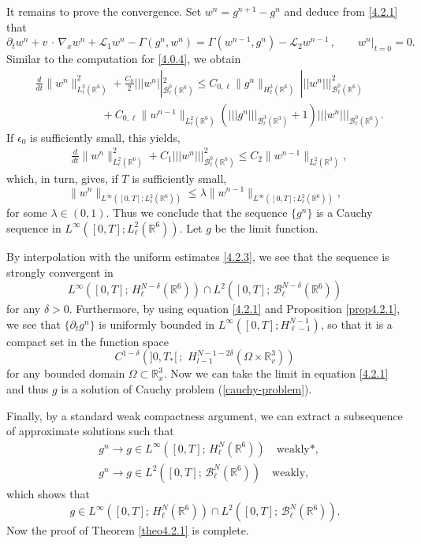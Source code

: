 \documentclass{amsart}[12pt, article]
\begin{document}
It remains to prove the convergence. Set $w^n=g^{n+1}-g^n$ and
deduce {}from \eqref{4.2.1} that
\begin{equation*}
\partial_t w^{n} + v\,\cdot\,\nabla_x w^{n} + {{\mathcal L}}_1 w^{n}
- \Gamma (g^n , w^{n})=\Gamma(w^{n-1}, g^n)-{{\mathcal L}}_2 w^{n-1}\,,\qquad w^{n}|_{t=0}=0.
\end{equation*}
Similar to the computation for \eqref{4.0.4}, we obtain
\begin{align*}\label{4.0.4-u}
&\frac{d}{d t}\|w^n\|^2_{L^2_\ell({{{\mathbb R}}}^6)}+\frac{C_0}{2}
|||w^n||^2_{{{\mathcal B}}^{0}_\ell({{{\mathbb R}}}^6)}\leq C_{0, \ell}
\|g^n\|_{H^3_\ell({{{\mathbb R}}}^6)} \,
|||w^n|||^2_{{{\mathcal B}}^{0}_\ell({{{\mathbb R}}}^6)}\\
&\qquad\qquad\qquad+C_{0,\ell}
\|w^{n-1}\|_{L^2_\ell({{{\mathbb R}}}^6)}(|||g^n|||_{{{\mathcal B}}^3_\ell({{{\mathbb R}}}^3)}
+1)|||w^n|||_{{{\mathcal B}}^0_\ell({{{\mathbb R}}}^6)}. \nonumber
\end{align*}
If $\epsilon_0$ is sufficiently small, this yields,
\begin{align*}
&\frac{d}{d t}\|w^n\|^2_{L^2_\ell({{{\mathbb R}}}^6)}+C_1
|||w^n|||^2_{{{\mathcal B}}^{0}_\ell({{{\mathbb R}}}^6)}\leq C_2
\|w^{n-1}\|_{L^2_\ell({{{\mathbb R}}}^3)},
 \nonumber
\end{align*}
which, in turn, gives, if $T$ is sufficiently small,
\[
\|w^n\|_{L^\infty([0, T]; L^2_\ell({{{\mathbb R}}}^6))}\le \lambda\|w^{n-1}\|_{L^\infty([0, T]; L^2_\ell({{{\mathbb R}}}^6))},
\]
for some $\lambda\in(0,1).$
Thus we conclude that the sequence $\{g^n\}$ is a Cauchy sequence in
$L^\infty([0, T]; L^2_\ell({{{\mathbb R}}}^6))$. Let $g$ be the limit function.

By interpolation with the uniform estimates \eqref{4.2.3}, we see that
the sequence is strongly convergent in
\[
L^\infty([0, T];\, H^{N-\delta}_\ell({{{\mathbb R}}}^6))\cap
L^2([0, T];\, {{\mathcal B}}^{N-\delta}_\ell({{{\mathbb R}}}^6))
\]
for any $\delta>0$.
Furthermore, by using equation
\eqref{4.2.1} and Proposition
\ref{prop4.2.1}, we see that $\{{{\partial}}_tg^n\}$ is uniformly bounded in 
$L^\infty([0,T]; H^{N-1}_{\ell-1})$, so that  it is a
compact set in  the function space
\[
C^{1-\delta} (]0, T_*[\,;\,\,H^{N-1-2\delta}_{l-1}(\Omega
\times{{{\mathbb R}}}^3_v))
\]
for any bounded domain $\Omega\subset{{{\mathbb R}}}^3_x$.
Now we can take the limit in equation \eqref{4.2.1}
and thus $g$ is a solution of Cauchy problem (\ref{cauchy-problem}).

Finally,
by a standard weak compactness argument, we can extract a subsequence
of approximate solutions such that
\begin{align*}
&g^n\rightarrow g\in L^\infty([0, T];\, H^N_\ell({{{\mathbb R}}}^6))
\quad\text{weakly*},
\\&
g^n\rightarrow g\in
L^2([0, T];\, {{\mathcal B}}^N_\ell({{{\mathbb R}}}^6)) \quad\text{weakly},
\end{align*}
which shows that
\[
g\in L^\infty([0, T];\, H^{N}_\ell({{{\mathbb R}}}^6))\cap
L^2([0, T];\, {{\mathcal B}}^{N}_\ell({{{\mathbb R}}}^6)).
\]
Now the proof of Theorem \ref{theo4.2.1}
 is complete.
\end{document}

